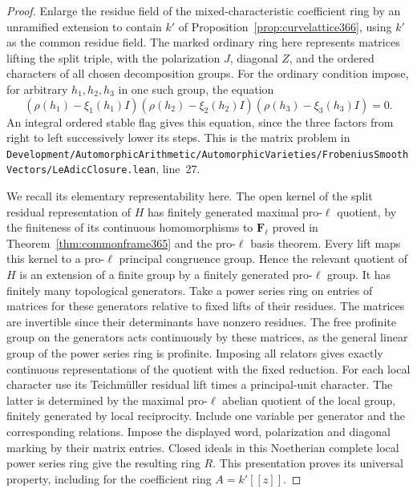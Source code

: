 \documentclass[a4paper,11pt]{article}
\theoremstyle{definition}
\theoremstyle{remark}
\newcommand{\srcloc}[2]{{\small\nolinkurl{#1.lean}}, line~#2}
\numberwithin{equation}{section}
\begin{document}
\begin{proof}
Enlarge the residue field of the mixed-characteristic
coefficient ring by an unramified extension to contain \(k'\)
of Proposition~\ref{prop:curvelattice366}, using \(k'\)
as the common residue field. The marked ordinary ring here
represents matrices lifting the split triple, with the
polarization \(J\), diagonal \(Z\), and the ordered characters
of all chosen decomposition groups. For the ordinary
condition impose, for arbitrary \(h_1,h_2,h_3\) in one such
group, the equation
\[
   (\rho(h_1)-\xi_1(h_1)I)(\rho(h_2)-\xi_2(h_2)I)
                         (\rho(h_3)-\xi_3(h_3)I)=0 .
\]
An integral ordered stable flag gives this equation, since
the three factors from right to left successively lower its
steps. This is the matrix problem in
\srcloc{Development/AutomorphicArithmetic/AutomorphicVarieties/FrobeniusSmoothVectors/LeAdicClosure}{27}.

We recall its elementary representability here. The open
kernel of the split residual representation of \(H\) has
finitely generated maximal pro-\(\ell\) quotient, by the
finiteness of its continuous homomorphisms to \(\mathbf F_\ell\)
proved in Theorem~\ref{thm:commonframe365} and the pro-\(\ell\)
basis theorem. Every lift maps this kernel to a pro-\(\ell\)
principal congruence group. Hence the relevant quotient of
\(H\) is an extension of a finite group by a finitely generated
pro-\(\ell\) group. It has finitely many topological generators.
Take a power series ring on entries of matrices for these
generators relative to fixed lifts of their residues. The
matrices are invertible since their determinants have
nonzero residues. The free profinite group on the generators
acts continuously by these matrices, as the general linear
group of the power series ring is profinite. Imposing all
relators gives exactly continuous representations of
the quotient with the fixed reduction. For each local
character use its Teichm\"uller residual lift times a
principal-unit character. The latter is determined by the
maximal pro-\(\ell\) abelian quotient of the local group,
finitely generated by local reciprocity. Include one
variable per generator and the corresponding relations.
Impose the displayed word, polarization and diagonal marking
by their matrix entries. Closed ideals in this Noetherian
complete local power series ring give the resulting ring
\(R\). This presentation proves its universal property,
including for the coefficient ring \(A=k'[[z]]\).


\end{proof}
\end{document}
